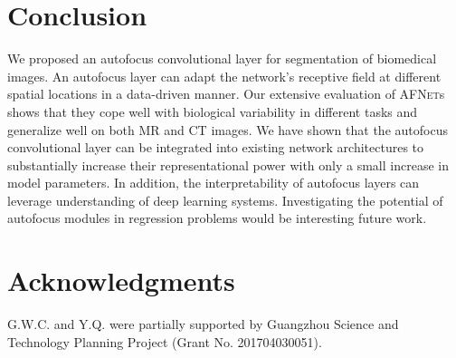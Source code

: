 \documentclass{llncs}
\newcommand{\afn}{\textsc{AFNet}}
\begin{document}
\vspace{-4mm}
\section{Conclusion}
\vspace{-3mm}
We proposed an autofocus convolutional layer for segmentation of biomedical images. An autofocus layer can adapt the network's receptive field at different spatial locations in a data-driven manner. 
Our extensive evaluation of \afn{}s shows that they cope well with biological variability in different tasks and generalize well on both MR and CT images. We have shown that the autofocus convolutional layer can be integrated into existing network architectures to substantially increase their representational power with only a small increase in model parameters. In addition, the interpretability of autofocus layers can leverage understanding of deep learning systems. Investigating the potential of autofocus modules in regression problems would be interesting future work.
\vspace{-3mm}
\section*{Acknowledgments}
\vspace{-3mm}
G.W.C. and Y.Q. were partially supported by Guangzhou Science and Technology Planning Project (Grant No. 201704030051).
\end{document}
